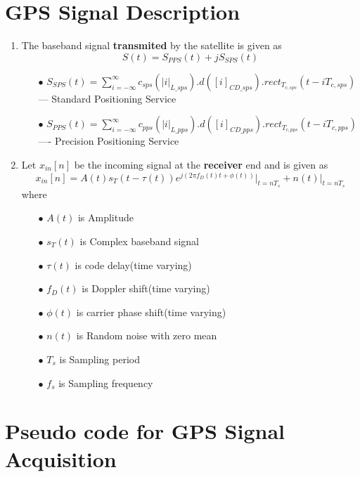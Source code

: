 \documentclass[journal,10pt,onecolumn]{article}
\begin{document}
\section*{GPS Signal Description}

\begin{enumerate}

    \item The baseband signal \textbf{transmited} by the satellite is given as 
    \begin{equation}
        S(t) = S_{PPS}(t)+ jS_{SPS}(t)
    \end{equation} 
    \begin{enumerate}
        \item[$\bullet$]  $S_{SPS}(t) = 	\sum_{i=-\infty}^{\infty}  c_{sps}(|i|_{L\_sps}) . d([i]_{CD\_sps}) . rect_{T_{c,sps}}(t-iT_{c,sps})$ --- Standard Positioning Service
        \item[$\bullet$] $S_{PPS}(t) = 	\sum_{i=-\infty}^{\infty}  c_{pps}(|i|_{L\_pps}) . d([i]_{CD\_pps}) . rect_{T_{c,pps}}(t-iT_{c,pps}) $ ----   Precision Positioning Service
    \end{enumerate}
    \item Let $x_{in}[n]$ be the incoming signal at the \textbf{receiver} end and is given as
	\begin{equation}
        x_{in}[n] = A(t) s_T(t-\tau (t))e^{j(2\pi f_D (t)t+\phi (t))}|_{t=nT_s}  + n(t)\vert _{t=nT_s}
    \end{equation}
    where \\
    \begin{enumerate}
        \item[$\bullet$] $A(t)$ is Amplitude
        \item[$\bullet$] $s_T(t)$ is Complex baseband signal
        \item[$\bullet$] $\tau(t)$ is code delay(time varying)
        \item[$\bullet$] $f_D(t)$ is Doppler shift(time varying)
        \item[$\bullet$] $\phi(t)$ is carrier phase shift(time varying)
        \item[$\bullet$]  $n(t)$ is Random noise with zero mean
        \item[$\bullet$] $T_s$ is Sampling period
        \item[$\bullet$] $f_s$ is Sampling frequency
    \end{enumerate}
\end{enumerate}


\section{Pseudo code for GPS Signal Acquisition}
\end{document}
